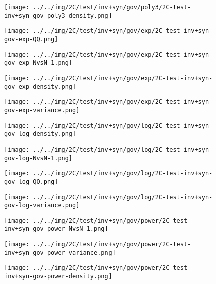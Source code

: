 \begin{figure}[H]
\centering	\texttt{[image: ../../img/2C/test/inv+syn/gov/poly3/2C-test-inv+syn-gov-poly3-density.png]}
\end{figure}
\begin{figure}[H]
\centering	\texttt{[image: ../../img/2C/test/inv+syn/gov/exp/2C-test-inv+syn-gov-exp-QQ.png]}
\end{figure}
\begin{figure}[H]
\centering	\texttt{[image: ../../img/2C/test/inv+syn/gov/exp/2C-test-inv+syn-gov-exp-NvsN-1.png]}
\end{figure}
\begin{figure}[H]
\centering	\texttt{[image: ../../img/2C/test/inv+syn/gov/exp/2C-test-inv+syn-gov-exp-density.png]}
\end{figure}
\begin{figure}[H]
\centering	\texttt{[image: ../../img/2C/test/inv+syn/gov/exp/2C-test-inv+syn-gov-exp-variance.png]}
\end{figure}
\begin{figure}[H]
\centering	\texttt{[image: ../../img/2C/test/inv+syn/gov/log/2C-test-inv+syn-gov-log-density.png]}
\end{figure}
\begin{figure}[H]
\centering	\texttt{[image: ../../img/2C/test/inv+syn/gov/log/2C-test-inv+syn-gov-log-NvsN-1.png]}
\end{figure}
\begin{figure}[H]
\centering	\texttt{[image: ../../img/2C/test/inv+syn/gov/log/2C-test-inv+syn-gov-log-QQ.png]}
\end{figure}
\begin{figure}[H]
\centering	\texttt{[image: ../../img/2C/test/inv+syn/gov/log/2C-test-inv+syn-gov-log-variance.png]}
\end{figure}
\begin{figure}[H]
\centering	\texttt{[image: ../../img/2C/test/inv+syn/gov/power/2C-test-inv+syn-gov-power-NvsN-1.png]}
\end{figure}
\begin{figure}[H]
\centering	\texttt{[image: ../../img/2C/test/inv+syn/gov/power/2C-test-inv+syn-gov-power-variance.png]}
\end{figure}
\begin{figure}[H]
\centering	\texttt{[image: ../../img/2C/test/inv+syn/gov/power/2C-test-inv+syn-gov-power-density.png]}
\end{figure}
